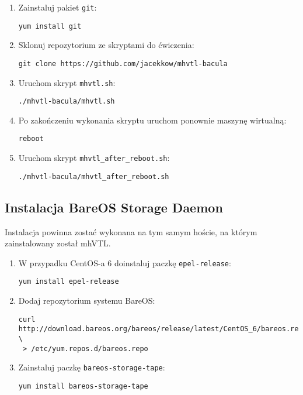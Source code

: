 \documentclass[polish]{article}
\begin{document}
\begin{enumerate}
\item Zainstaluj pakiet \texttt{git}:
\begin{verbatim}
yum install git
\end{verbatim}
\item Sklonuj repozytorium ze skryptami do ćwiczenia:
\begin{verbatim}
git clone https://github.com/jacekkow/mhvtl-bacula
\end{verbatim}
\item Uruchom skrypt \texttt{mhvtl.sh}:
\begin{verbatim}
./mhvtl-bacula/mhvtl.sh
\end{verbatim}
\item Po zakończeniu wykonania skryptu uruchom ponownie maszynę wirtualną:
\begin{verbatim}
reboot
\end{verbatim}
\item Uruchom skrypt \texttt{mhvtl\_after\_reboot.sh}:
\begin{verbatim}
./mhvtl-bacula/mhvtl_after_reboot.sh
\end{verbatim}

\end{enumerate}


\subsection*{Instalacja BareOS Storage Daemon}

Instalacja powinna zostać wykonana na tym samym hoście,
na którym zainstalowany został mhVTL.

\begin{enumerate}

\item W przypadku CentOS-a 6 doinstaluj paczkę \texttt{epel-release}:
\begin{verbatim}
yum install epel-release
\end{verbatim}

\item Dodaj repozytorium systemu BareOS:
\begin{verbatim}
curl http://download.bareos.org/bareos/release/latest/CentOS_6/bareos.repo \
 > /etc/yum.repos.d/bareos.repo
\end{verbatim}

\item Zainstaluj paczkę \texttt{bareos-storage-tape}:
\begin{verbatim}
yum install bareos-storage-tape
\end{verbatim}

\end{enumerate}
\end{document}
